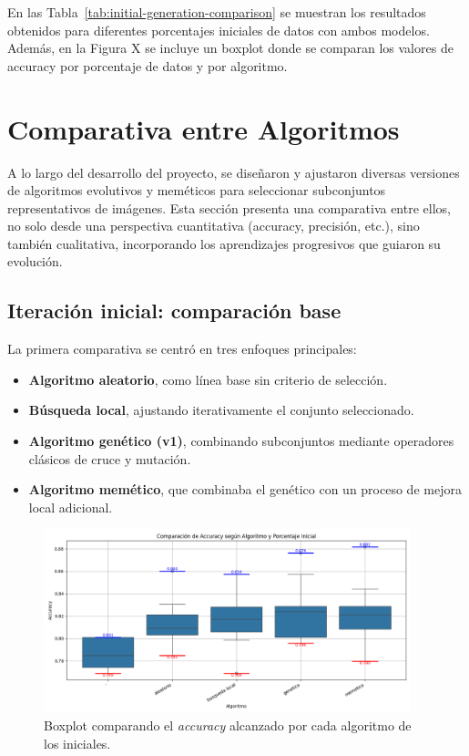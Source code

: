 En las Tabla~\ref{tab:initial-generation-comparison} se muestran los resultados obtenidos para diferentes porcentajes iniciales de datos con ambos modelos.
Además, en la Figura X se incluye un boxplot donde se comparan los valores de accuracy por porcentaje de datos y por algoritmo.

\section{Comparativa entre Algoritmos}\label{sec:comparativa-entre-algoritmos}
A lo largo del desarrollo del proyecto, se diseñaron y ajustaron diversas versiones de algoritmos evolutivos y meméticos para seleccionar subconjuntos representativos de imágenes. Esta sección presenta una comparativa entre ellos, no solo desde una perspectiva cuantitativa (accuracy, precisión, etc.), sino también cualitativa, incorporando los aprendizajes progresivos que guiaron su evolución.

\subsection{Iteración inicial: comparación base}\label{sec:iteracion-inicial-comparacion-base}
La primera comparativa se centró en tres enfoques principales:

\begin{itemize}
    \item \textbf{Algoritmo aleatorio}, como línea base sin criterio de selección.
    \item \textbf{Búsqueda local}, ajustando iterativamente el conjunto seleccionado.
    \item \textbf{Algoritmo genético (v1)}, combinando subconjuntos mediante operadores clásicos de cruce y mutación.
    \item \textbf{Algoritmo memético}, que combinaba el genético con un proceso de mejora local adicional.
\end{itemize}

\begin{figure}[!h]
    \centering
    \includegraphics[width=0.95\textwidth]{imagenes/mobilenet-BOXPLOT-generacion-inicial}
    \caption{Boxplot comparando el \textit{accuracy} alcanzado por cada algoritmo de los iniciales.}
    \label{fig:boxplot-generacion-inicial}
\end{figure}


